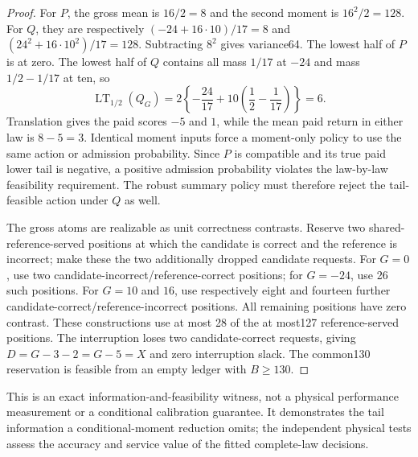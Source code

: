 \begin{proof}
For $P$, the gross mean is $16/2=8$ and the second moment is
$16^2/2=128$. For $Q$, they are respectively
$(-24+16\cdot10)/17=8$ and
$(24^2+16\cdot10^2)/17=128$. Subtracting $8^2$ gives variance64.
The lowest half of $P$ is at zero. The lowest half of $Q$ contains all
mass $1/17$ at $-24$ and mass $1/2-1/17$ at ten, so
\begin{equation}
 \operatorname{LT}_{1/2}(Q_G)
 =2\left\{-\frac{24}{17}+10\left(\frac12-\frac1{17}\right)\right\}
 =6.
\end{equation}
Translation gives the paid scores $-5$ and $1$, while the mean paid
return in either law is $8-5=3$. Identical moment inputs force a
moment-only policy to use the same action or admission probability.
Since $P$ is compatible and its true paid lower tail is negative, a
positive admission probability violates the law-by-law feasibility
requirement. The robust summary policy must therefore reject the
tail-feasible action under $Q$ as well.

The gross atoms are realizable as unit correctness contrasts. Reserve
two shared-reference-served positions at which the candidate is correct
and the reference is incorrect; make these the two additionally dropped
candidate requests. For $G=0$, use two candidate-incorrect/reference-correct
positions; for $G=-24$, use 26 such positions. For $G=10$ and $16$,
use respectively eight and fourteen further
candidate-correct/reference-incorrect positions. All remaining positions
have zero contrast. These constructions use at most 28 of the at most127
reference-served positions. The interruption loses two candidate-correct
requests, giving $D=G-3-2=G-5=X$ and zero interruption slack.
The common130 reservation is feasible from an empty ledger with $B\geq130$.
\end{proof}
This is an exact information-and-feasibility witness, not a physical
performance measurement or a conditional calibration guarantee. It
demonstrates the tail information a conditional-moment reduction omits;
the independent physical tests assess the accuracy and service value of
the fitted complete-law decisions.
